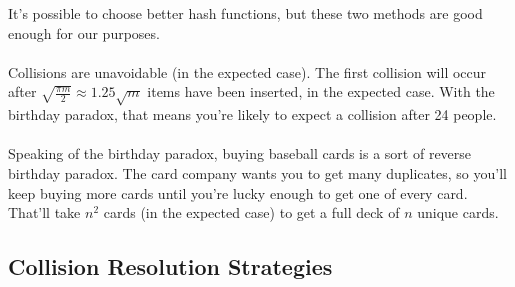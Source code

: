 \documentclass[]{article}
\theoremstyle{definition}
\begin{document}
		It's possible to choose better hash functions, but these two methods are good enough for our purposes.
		\\ \\
		Collisions are unavoidable (in the expected case). The first collision will occur after $\sqrt{\frac{\pi m}{2}} \approx 1.25 \sqrt m$ items have been inserted, in the expected case. With the birthday paradox, that means you're likely to expect a collision after 24 people.
		\\ \\
		Speaking of the birthday paradox, buying baseball cards is a sort of reverse birthday paradox. The card company wants you to get many duplicates, so you'll keep buying more cards until you're lucky enough to get one of every card. That'll take $n^2$ cards (in the expected case) to get a full deck of $n$ unique cards.

		\subsection{Collision Resolution Strategies}
\end{document}
